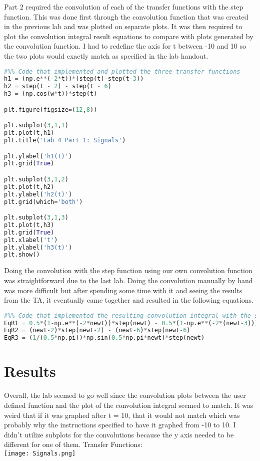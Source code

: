 \documentclass[12pt]{report}
\begin{document}
Part 2 required the convolution of each of the transfer functions with the step function. This was done first through the convolution function that was created in the previous lab and was plotted on separate plots. It was then required to plot the convolution integral result equations to compare with plots generated by the convolution function. I had to redefine the axis for t between -10 and 10 so the two plots would exactly match as specified in the lab handout. 
\begin{lstlisting}[language=Python]
#%% Code that implemented and plotted the three transfer functions
h1 = (np.e**(-2*t))*(step(t)-step(t-3))
h2 = step(t - 2) - step(t - 6)
h3 = (np.cos(w*t))*step(t)

plt.figure(figsize=(12,8))

plt.subplot(3,1,1)
plt.plot(t,h1)
plt.title('Lab 4 Part 1: Signals')

plt.ylabel('h1(t)') 
plt.grid(True)

plt.subplot(3,1,2)
plt.plot(t,h2)
plt.ylabel('h2(t)')
plt.grid(which='both')

plt.subplot(3,1,3)
plt.plot(t,h3)
plt.grid(True)
plt.xlabel('t')
plt.ylabel('h3(t)')
plt.show()
\end{lstlisting}
Doing the convolution with the step function using our own convolution function was straightforward due to the last lab. Doing the convolution manually by hand was more difficult but after spending some time with it and seeing the results from the TA, it eventually came together and resulted in the following equations. 
\begin{lstlisting}[language=Python]
#%% Code that implemented the resulting convolution integral with the step function to be compared 
EqR1 = 0.5*(1-np.e**(-2*newt))*step(newt) - 0.5*(1-np.e**(-2*(newt-3)))*step(newt-3)
EqR2 = (newt-2)*step(newt-2) - (newt-6)*step(newt-6)
EqR3 = (1/(0.5*np.pi))*np.sin(0.5*np.pi*newt)*step(newt)
\end{lstlisting}
\section{Results}

Overall, the lab seemed to go well since the convolution plots between the user defined function and the plot of the convolution integral seemed to match. It was weird that if it was graphed after t = 10, that it would not match which was probably why the instructions specified to have it graphed from -10 to 10. I didn't utilize subplots for the convolutions because the y axis needed to be different for one of them. 
\newpage
Transfer Functions: 
\\ \texttt{[image: Signals.png]}
\end{document}
